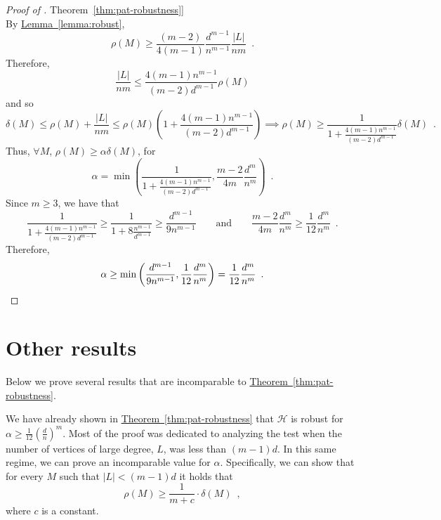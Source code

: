 \documentclass[11pt]{article}
\numberwithin{equation}{section}
\theoremstyle{definition}
\theoremstyle{plain}
\newcommand{\expref}[2]{\hyperref[#2]{#1~\ref{#2}}}
\theoremstyle{plain}
\newcommand{\colored}{}
\newcommand{\reldist}{\colored{\delta}}
\newcommand{\robust}{\colored{\rho}} %
\newcommand{\tester}{\colored{\mathcal H}} %
\newcommand{\codedist}{\colored{d}} %
\newcommand{\blocklength}{\colored{n}} %
\newcommand{\testerinput}{\colored{M}} %
\newcommand\abs[1]{\colored{\left|#1\right|}}
\begin{document}
\begin{proof}[Proof of \expref{Theorem}{thm:pat-robustness}]
\begin{equation*}
\end{equation*}
By \expref{Lemma}{lemma:robust},
\[
  \robust(\testerinput) \geq \frac{(m-2)}{4 (m-1)} \frac{\codedist^{m-1}}{\blocklength^{m-1}} \frac{\abs{L}}{\blocklength m}\enspace.
\]
Therefore,
\[
  \frac{\abs{L}}{\blocklength m} \leq \frac{4(m-1)\blocklength^{m-1}}{(m-2)\codedist^{m-1}} \robust(\testerinput)
\]
and so
\begin{equation*}
\reldist(\testerinput) \leq \robust(\testerinput) + \frac{\abs{L}}{\blocklength m} \leq \robust(\testerinput) \left(1 +  \frac{4(m-1)\blocklength^{m-1}}{(m-2)\codedist^{m-1}}  \right) \implies \robust(\testerinput) \geq \frac{1}{1 +  \frac{4(m-1)\blocklength^{m-1}}{(m-2)\codedist^{m-1}}} \reldist(\testerinput) \enspace.
\end{equation*}
Thus, $\forall \testerinput$, $\robust(\testerinput) \geq \alpha \reldist(\testerinput)$, for
\[
  \alpha = \min \left (\frac{1}{1 +  \frac{4(m-1)\blocklength^{m-1}}{(m-2)\codedist^{m-1}}}, \frac{m-2}{4m} \frac{\codedist^m}{\blocklength^m}\right)\enspace.
\]
Since $m \geq 3$, we have that
\[
  \frac{1}{1 +  \frac{4(m-1)\blocklength^{m-1}}{(m-2)\codedist^{m-1}}} \geq \frac{1}{1 + 8\frac{\blocklength^{m-1}}{\codedist^{m-1}} } \geq \frac{\codedist^{m-1}}{9\blocklength^{m-1}}
\qquad
\text{and}
\qquad
  \frac{m-2}{4m} \frac{\codedist^m}{\blocklength^m}  \geq \frac{1}{12} \frac{\codedist^m}{\blocklength^m}\enspace.
\]
Therefore,
\[
  \alpha \geq \min\left(\frac{\codedist^{m-1}}{9\blocklength^{m-1}}, \frac{1}{12} \frac{\codedist^m}{\blocklength^m}\right) = \frac{1}{12} \frac{\codedist^m}{\blocklength^m}\enspace.\qedhere
  \]
  \end{proof}






%
%


%
%
%
%
%
%

%
%
%

\section{Other results}
\label{sec:other}

%
Below we prove several results that are incomparable to \expref{Theorem}{thm:pat-robustness}.       %

We have already shown in \expref{Theorem}{thm:pat-robustness} that $\tester$ is robust for $\alpha \geq \frac{1}{12} \left(\frac{\codedist}{\blocklength}\right)^m$. Most of the proof was dedicated to analyzing the test when the
%
number of  %
%
%
vertices of large degree, %
$L$, was less than $(m-1)\codedist$. In this same regime, we can prove an incomparable value for $\alpha$. Specifically, we can show that for every $\testerinput$ such that $\abs{L} < (m-1) \codedist$ it holds that
\[
  \robust(\testerinput) \geq \frac{1}{m + c} \cdot \reldist(\testerinput)\enspace,
\]
where $c$ is a constant.
\end{document}
